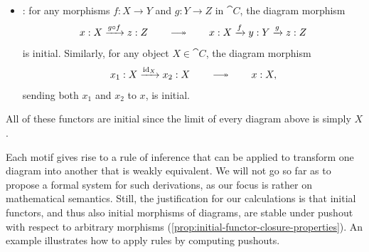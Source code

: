 \documentclass[11pt]{article}
\numberwithin{equation}{section}
\begin{document}
\begin{itemize}
\begin{equation*}
    \end{equation*}
    is initial.
  \item {}: for any morphisms $f: X \to Y$ and
    $g: Y \to Z$ in $\cat{C}$, the diagram morphism
    \begin{equation*}
      x: X \xto{g \circ f} z: Z
      \qquad\longinitialto\qquad
      x: X \xto{f} y: Y \xto{g} z: Z
    \end{equation*}
    is initial. Similarly, for any object $X \in \cat{C}$, the diagram morphism
    \begin{equation*}
      x_1: X \xto{\id_X} x_2: X
      \qquad\longinitialto\qquad
      x: X,
    \end{equation*}
    sending both $x_1$ and $x_2$ to $x$, is initial.
\end{itemize}
All of these functors are initial since the limit of every diagram above is
simply $X$.

Each motif gives rise to a rule of inference that can be applied to transform
one diagram into another that is weakly equivalent. We will not go so far as to
propose a formal system for such derivations, as our focus is rather on
mathematical semantics. Still, the justification for our calculations is that
initial functors, and thus also initial morphisms of diagrams, are stable under
pushout with respect to arbitrary morphisms
(\cref{prop:initial-functor-closure-properties}). An example illustrates how to
apply rules by computing pushouts.
\end{document}
